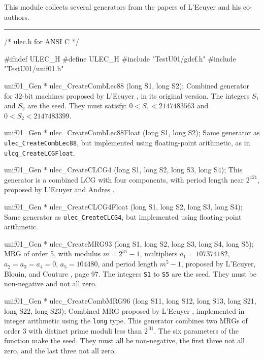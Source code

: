 
This module collects several generators from the papers of
L'Ecuyer and his co-authors.

\bigskip
\hrule
\code
\hide
/*  ulec.h  for ANSI C  */

#ifndef ULEC_H
#define ULEC_H
\endhide
#include "TestU01/gdef.h"
#include "TestU01/unif01.h"


unif01_Gen * ulec_CreateCombLec88 (long S1, long S2);
\endcode
 \tab  Combined generator for 32-bit machines proposed by
  L'Ecuyer \cite{rLEC88a}, in its original version.
%
  The integers $S_1$ and $S_2$ are the seed.
  They must satisfy: $0 < S_1 < 2147483563$ and $0 < S_2 < 2147483399$.
 \endtab
\code


unif01_Gen * ulec_CreateCombLec88Float (long S1, long S2);
\endcode
 \tab  Same generator as {\tt ulec\_CreateCombLec88},
  but implemented using floating-point arithmetic, as in
  {\tt ulcg\_CreateLCGFloat}.
 \endtab
\code


unif01_Gen * ulec_CreateCLCG4 (long S1, long S2, long S3, long S4);
\endcode
 \tab  This generator is a combined LCG with four components,
%
  with period length near $2^{121}$,
  proposed by L'Ecuyer and Andres \cite{rLEC97d}.
 \endtab
\code


unif01_Gen * ulec_CreateCLCG4Float (long S1, long S2, long S3, long S4);
\endcode
 \tab  Same generator as {\tt ulec\_CreateCLCG4},
  but implemented using floating-point arithmetic.
 \endtab
\code


unif01_Gen * ulec_CreateMRG93 (long S1, long S2, long S3, long S4, long S5);
\endcode
 \tab  MRG of order 5, with modulus $m=2^{31}-1$, multipliers
   $a_1 = 107374182$, $a_2 = a_3 = a_4 = 0$, $a_5 = 104480$,
   and period length $m^5-1$, proposed by
  L'Ecuyer, Blouin, and Couture \cite{rLEC93a}, page 97.
%
  The integers {\tt S1} to {\tt S5} are the seed.
  They must be non-negative and not all zero.
 \endtab
\code


unif01_Gen * ulec_CreateCombMRG96 (long S11, long S12, long S13, 
                                   long S21, long S22, long S23);
\endcode
 \tab  Combined MRG proposed by L'Ecuyer \cite{rLEC96b}, implemented
   in integer arithmetic using the {\tt long} type.
   This generator combines two MRGs of order 3 with distinct prime
%
   moduli less than $2^{\,31}$.
   The six parameters of the function make the seed.
   They must all be non-negative, the first three not all zero,
   and the last three not all zero.
 \endtab
\code


